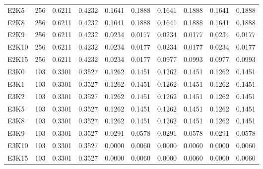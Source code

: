 \begin{table}[!ht]
\begin{tabular}{lrrrrrrrrr}
E2K5 & 256 & 0.6211 & 0.4232 & 0.1641 & 0.1888 & 0.1641 & 0.1888 & 0.1641 & 0.1888 \\
E2K8 & 256 & 0.6211 & 0.4232 & 0.1641 & 0.1888 & 0.1641 & 0.1888 & 0.1641 & 0.1888 \\
E2K9 & 256 & 0.6211 & 0.4232 & 0.0234 & 0.0177 & 0.0234 & 0.0177 & 0.0234 & 0.0177 \\
E2K10 & 256 & 0.6211 & 0.4232 & 0.0234 & 0.0177 & 0.0234 & 0.0177 & 0.0234 & 0.0177 \\
E2K15 & 256 & 0.6211 & 0.4232 & 0.0234 & 0.0177 & 0.0977 & 0.0993 & 0.0977 & 0.0993 \\
E3K0 & 103 & 0.3301 & 0.3527 & 0.1262 & 0.1451 & 0.1262 & 0.1451 & 0.1262 & 0.1451 \\
E3K1 & 103 & 0.3301 & 0.3527 & 0.1262 & 0.1451 & 0.1262 & 0.1451 & 0.1262 & 0.1451 \\
E3K2 & 103 & 0.3301 & 0.3527 & 0.1262 & 0.1451 & 0.1262 & 0.1451 & 0.1262 & 0.1451 \\
E3K5 & 103 & 0.3301 & 0.3527 & 0.1262 & 0.1451 & 0.1262 & 0.1451 & 0.1262 & 0.1451 \\
E3K8 & 103 & 0.3301 & 0.3527 & 0.1262 & 0.1451 & 0.1262 & 0.1451 & 0.1262 & 0.1451 \\
E3K9 & 103 & 0.3301 & 0.3527 & 0.0291 & 0.0578 & 0.0291 & 0.0578 & 0.0291 & 0.0578 \\
E3K10 & 103 & 0.3301 & 0.3527 & 0.0000 & 0.0060 & 0.0000 & 0.0060 & 0.0000 & 0.0060 \\
E3K15 & 103 & 0.3301 & 0.3527 & 0.0000 & 0.0060 & 0.0000 & 0.0060 & 0.0000 & 0.0060 \\
\hline
\end{tabular}
\end{table}
